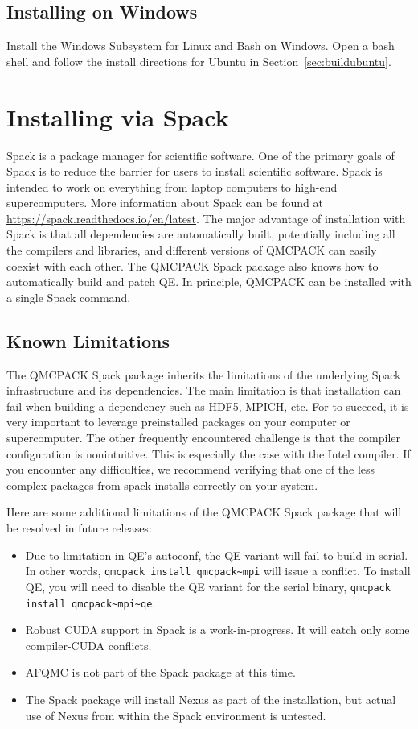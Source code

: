 \subsection{Installing on Windows}
Install the Windows Subsystem for Linux and Bash on Windows.
Open a bash shell and follow the install directions for Ubuntu in Section~\ref{sec:buildubuntu}.

\section{Installing via Spack}
Spack is a package manager for scientific software.
One of the primary goals of Spack is to reduce the barrier for users to install scientific
software. Spack is intended to work on everything from laptop
computers to high-end supercomputers. More information about Spack can
be found at \url{https://spack.readthedocs.io/en/latest}. The major
advantage of installation with Spack is that all dependencies are
automatically built, potentially including all the compilers and libraries, and
different versions of QMCPACK can easily coexist with each other.
The QMCPACK Spack package also knows how to automatically build
and patch QE. In principle, QMCPACK can be installed with
a single Spack command.

\subsection{Known Limitations}
The QMCPACK Spack package inherits the limitations of the underlying
Spack infrastructure and its dependencies. The main limitation is that installation can fail when building a
dependency such as HDF5, MPICH, etc. For
 to succeed, it is very important to
leverage preinstalled packages on your computer or supercomputer. The
other frequently encountered challenge is that the compiler configuration
is nonintuitive.  This is especially the case with the Intel
compiler. If you encounter any difficulties, we recommend verifying that one of the less complex packages from spack installs
correctly on your system.

Here are some additional limitations of the QMCPACK Spack package that
will be resolved in future releases:
\begin{itemize}
\item Due to limitation in QE's autoconf, the QE variant will fail to build
  in serial. In other words, \verb|qmcpack install qmcpack~mpi| will issue
  a conflict. To install QE, you will need to disable the QE variant
  for the serial binary, \verb|qmcpack install qmcpack~mpi~qe|. 

\item Robust CUDA support in Spack is a work-in-progress.  It will
  catch only some compiler-CUDA conflicts.
\item AFQMC is not part of the Spack package at this time.
\item The Spack package will install Nexus as part of the
  installation, but actual use of Nexus from within the Spack
  environment is untested.
\end{itemize}

